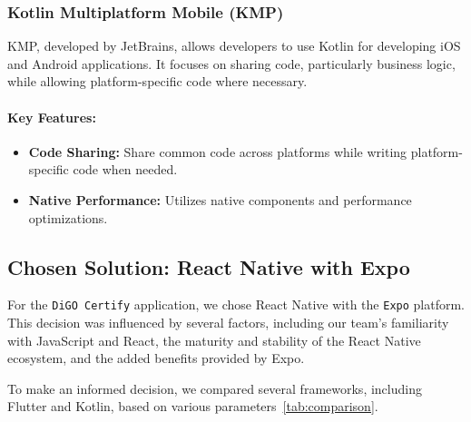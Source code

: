 \subsubsection{Kotlin Multiplatform Mobile (KMP)}

KMP, developed by JetBrains, allows developers to use Kotlin for developing iOS and Android applications. It focuses on sharing code, particularly business logic, while allowing platform-specific code where necessary\cite{KMP}.

\paragraph{Key Features:}

\begin{itemize}
    \item \textbf{Code Sharing:} Share common code across platforms while writing platform-specific code when needed.
    \item \textbf{Native Performance:} Utilizes native components and performance optimizations.
\end{itemize}

\subsection{Chosen Solution: React Native with Expo}

For the \texttt{DiGO Certify} application, we chose React Native with the \texttt{Expo} platform. This decision was influenced by several factors, including our team's familiarity with JavaScript and React, the maturity and stability of the React Native ecosystem, and the added benefits provided by Expo\cite{Expo}.

To make an informed decision, we compared several frameworks, including Flutter and Kotlin, based on various parameters~\ref{tab:comparison}.

